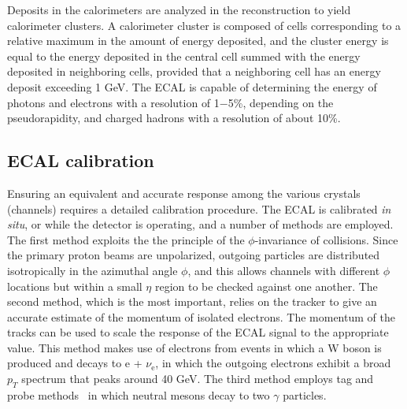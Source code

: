 Deposits in the calorimeters are analyzed in the reconstruction to yield calorimeter clusters. A calorimeter cluster is composed of cells corresponding to a relative maximum in the amount of energy deposited, and the cluster energy is equal to the energy deposited in the central cell summed with the energy deposited in neighboring cells, provided that a neighboring cell has an energy deposit exceeding 1 GeV. The ECAL is capable of determining the energy of photons and electrons with a resolution of 1$-$5\%, depending on the pseudorapidity, and charged hadrons with a resolution of about 10\%. 



\subsection{ECAL calibration}
Ensuring an equivalent and accurate response among the various crystals (channels) requires a detailed calibration procedure. The ECAL is calibrated {\it in situ}, or while the detector is operating, and a number of methods are employed. The first method exploits the the principle of the $\phi$-invariance of collisions. Since the primary proton beams are unpolarized, outgoing particles are distributed isotropically in the azimuthal angle $\phi$, and this allows channels with different $\phi$ locations but within a small $\eta$ region to be checked against one another. The second method, which is the most important, relies on the tracker to give an accurate estimate of the momentum of isolated electrons. The momentum of the tracks can be used to scale the response of the ECAL signal to the appropriate value. This method makes use of electrons from events in which a W boson is produced and decays to e + $\nu_{\text{e}}$, in which the outgoing electrons exhibit a broad $p_T$ spectrum that peaks around 40 GeV. The third method employs tag and probe methods~\cite{Beaudette:2014cea} in which neutral mesons decay to two $\gamma$ particles. 

